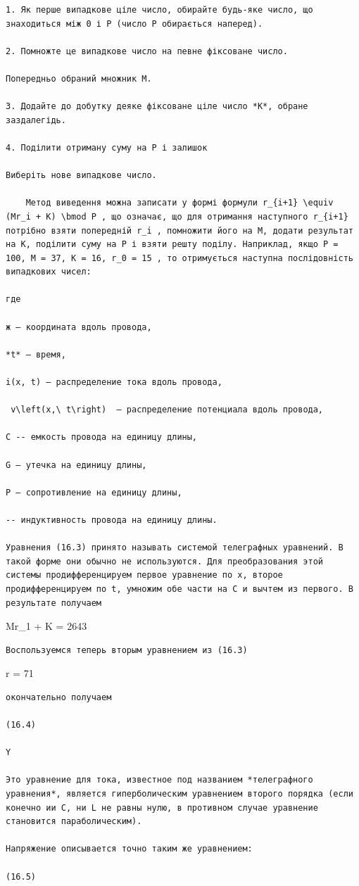 \documentclass[
  ukrainian,
]{article}
\begin{document}
\begin{verbatim}
1. Як перше випадкове ціле число, обирайте будь-яке число, що знаходиться між 0 і P (число P обирається наперед).

2. Помножте це випадкове число на певне фіксоване число.

Попередньо обраний множник M.

3. Додайте до добутку деяке фіксоване ціле число *K*, обране заздалегідь.

4. Поділити отриману суму на P і залишок

Виберіть нове випадкове число.

    Метод виведення можна записати у формі формули r_{i+1} \equiv (Mr_i + K) \bmod P , що означає, що для отримання наступного r_{i+1} потрібно взяти попередній r_i , помножити його на M, додати результат на K, поділити суму на P і взяти решту поділу. Наприклад, якщо P = 100, M = 37, K = 16, r_0 = 15 , то отримується наступна послідовність випадкових чисел:

где

ж — координата вдоль провода,

*t* — время,

i(x, t) — распределение тока вдоль провода,

 v\left(x,\ t\right)  — распределение потенциала вдоль провода,

С -- емкость провода на единицу длины,

G — утечка на единицу длины,

Р — сопротивление на единицу длины,

-- индуктивность провода на единицу длины.

Уравнения (16.3) принято называть системой телеграфных уравнений. В такой форме они обычно не используются. Для преобразования этой системы продифференцируем первое уравнение по x, второе продифференцируем по t, умножим обе части на C и вычтем из первого. В результате получаем
\end{verbatim}

Mr\_1 + K = 2643

\begin{verbatim}
Воспользуемся теперь вторым уравнением из (16.3)
\end{verbatim}

r = 71

\begin{verbatim}
окончательно получаем

(16.4)

Y

Это уравнение для тока, известное под названием *телеграфного уравнения*, является гиперболическим уравнением второго порядка (если конечно ии C, ни L не равны нулю, в противном случае уравнение становится параболическим).

Напряжение описывается точно таким же уравнением:

(16.5)
\end{verbatim}
\end{document}
